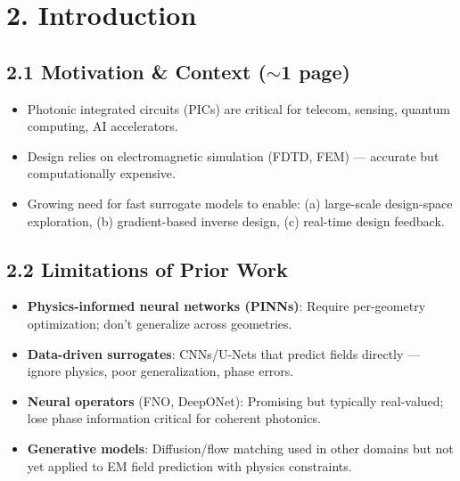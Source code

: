 \documentclass[11pt,letterpaper]{article}
\begin{document}
\section{2. Introduction}

\subsection{2.1 Motivation \& Context ($\sim$1 page)}
\begin{itemize}
    \item Photonic integrated circuits (PICs) are critical for telecom, sensing, quantum computing, AI accelerators.
    \item Design relies on electromagnetic simulation (FDTD, FEM) --- accurate but computationally expensive.
    \item Growing need for fast surrogate models to enable: (a) large-scale design-space exploration, (b) gradient-based inverse design, (c) real-time design feedback.
\end{itemize}

\subsection{2.2 Limitations of Prior Work}
\begin{itemize}
    \item \textbf{Physics-informed neural networks (PINNs)}: Require per-geometry optimization; don't generalize across geometries.
    \item \textbf{Data-driven surrogates}: CNNs/U-Nets that predict fields directly --- ignore physics, poor generalization, phase errors.
    \item \textbf{Neural operators} (FNO, DeepONet): Promising but typically real-valued; lose phase information critical for coherent photonics.
    \item \textbf{Generative models}: Diffusion/flow matching used in other domains but not yet applied to EM field prediction with physics constraints.
\end{itemize}
\end{document}

